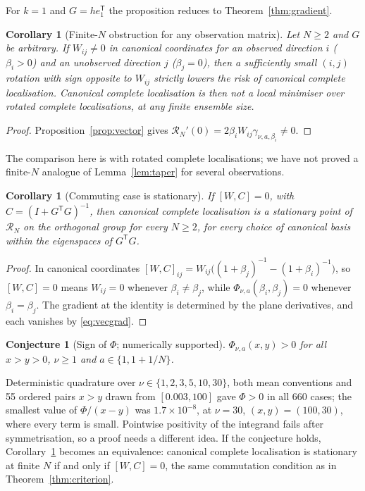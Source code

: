 \documentclass[11pt,a4paper]{article}
\numberwithin{equation}{section}
\newtheorem{corollary}[theorem]{Corollary}
\newtheorem{conjecture}[theorem]{Conjecture}
\theoremstyle{remark}\newtheorem{remark}[theorem]{Remark}
\newcommand{\risk}{\mathcal R}
\newcommand{\T}{^{\mathsf T}}
\begin{document}
For \(k=1\) and \(G=he_1\T\) the proposition reduces to Theorem~\ref{thm:gradient}.

\begin{corollary}[Finite-\(N\) obstruction for any observation matrix]\label{cor:obsunobs}
Let \(N\ge2\) and \(G\) be arbitrary. If \(W_{ij}\ne0\) in canonical coordinates for an observed
direction \(i\) (\(\beta_i>0\)) and an unobserved direction \(j\) (\(\beta_j=0\)), then a
sufficiently small \((i,j)\) rotation with sign opposite to \(W_{ij}\) strictly lowers the risk
of canonical complete localisation. Canonical complete localisation is then not a local
minimiser over rotated complete localisations, at any finite ensemble size.
\end{corollary}
\begin{proof}
Proposition~\ref{prop:vector} gives \(\risk_N'(0)=2\beta_iW_{ij}\gamma_{\nu,a,\beta_i}\ne0\).
\end{proof}

The comparison here is with rotated complete localisations; we have not proved a finite-\(N\)
analogue of Lemma~\ref{lem:taper} for several observations.

\begin{corollary}[Commuting case is stationary]\label{cor:commute}
If \([W,C]=0\), with \(C=(I+G\T G)^{-1}\), then canonical complete localisation is a stationary
point of \(\risk_N\) on the orthogonal group for every \(N\ge2\), for every choice of canonical
basis within the eigenspaces of \(G\T G\).
\end{corollary}
\begin{proof}
In canonical coordinates \([W,C]_{ij}=W_{ij}\bigl((1+\beta_j)^{-1}-(1+\beta_i)^{-1}\bigr)\), so
\([W,C]=0\) means \(W_{ij}=0\) whenever \(\beta_i\ne\beta_j\), while
\(\Phi_{\nu,a}(\beta_i,\beta_j)=0\) whenever \(\beta_i=\beta_j\). The gradient at the identity is
determined by the plane derivatives, and each vanishes by \eqref{eq:vecgrad}.
\end{proof}

\begin{conjecture}[Sign of \(\Phi\); numerically supported]\label{conj:phisign}
\(\Phi_{\nu,a}(x,y)>0\) for all \(x>y>0\), \(\nu\ge1\) and \(a\in\{1,1+1/N\}\).
\end{conjecture}

Deterministic quadrature over \(\nu\in\{1,2,3,5,10,30\}\), both mean conventions and 55
ordered pairs \(x>y\) drawn from \([0.003,100]\) gave \(\Phi>0\) in all 660 cases; the smallest
value of \(\Phi/(x-y)\) was \(1.7\times10^{-8}\), at \(\nu=30\), \((x,y)=(100,30)\), where every term is
small. Pointwise positivity of the integrand fails after symmetrisation, so a proof needs a
different idea. If the conjecture holds, Corollary~\ref{cor:commute} becomes an equivalence:
canonical complete localisation is stationary at finite \(N\) if and only if \([W,C]=0\), the
same commutation condition as in Theorem~\ref{thm:criterion}.
\end{document}
